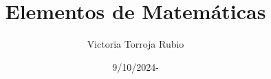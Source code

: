\documentclass{report}
\begin{document}
\title{Elementos de Matemáticas}
\author{Victoria Torroja Rubio}
\date{9/10/2024-}

\maketitle

\tableofcontents

\pagebreak


\end{document}
